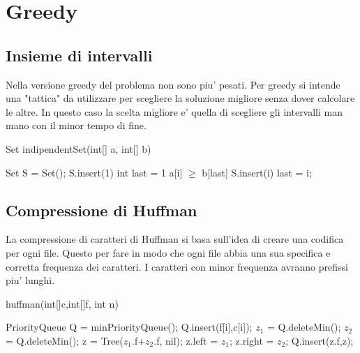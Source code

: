 \documentclass[oneside]{book}
\begin{document}
\chapter{Greedy}
\section{Insieme di intervalli}
Nella versione greedy del problema non sono piu' pesati. Per greedy si intende una "tattica" da utilizzare per scegliere la soluzione migliore senza dover calcolare le altre. In questo caso la scelta migliore e' quella di scegliere gli intervalli man mano con il minor tempo di fine. 


\begin{algorithm}
\caption{Set indipendentSet(int[] a, int[] b)\label{alg:cap}}
\begin{algorithmic}
Set S = Set();
S.insert(1)
int last = 1
	\If
		{a[i] $\geq $ b[last]}
		\State S.insert(i)
		\State last = i;
	\EndIf
\EndFor
\end{algorithmic}
\end{algorithm}
\newpage
\section{Compressione di Huffman}
La compressione di caratteri di Huffman si basa sull'idea di creare una codifica per ogni file. Questo per fare in modo che ogni file abbia una sua specifica e corretta frequenza dei caratteri. I caratteri con minor frequenza avranno prefissi piu' lunghi.

\begin{algorithm}
\caption{huffman(int[]c,int[]f, int n)\label{alg:cap}}
\begin{algorithmic}
\State PriorityQueue Q = minPriorityQueue();
	\State Q.insert(f[i],c[i]);
\EndFor
{}
	\State $z_1$ = Q.deleteMin();
	\State $z_2$ = Q.deleteMin();
	\State z = Tree($z_1$.f+$z_2$.f, nil);	
	\State z.left = $z_1$;
	\State z.right = $z_2$;
	\State Q.insert(z.f,z);
\EndFor
\end{algorithmic}
\end{algorithm}
\end{document}
